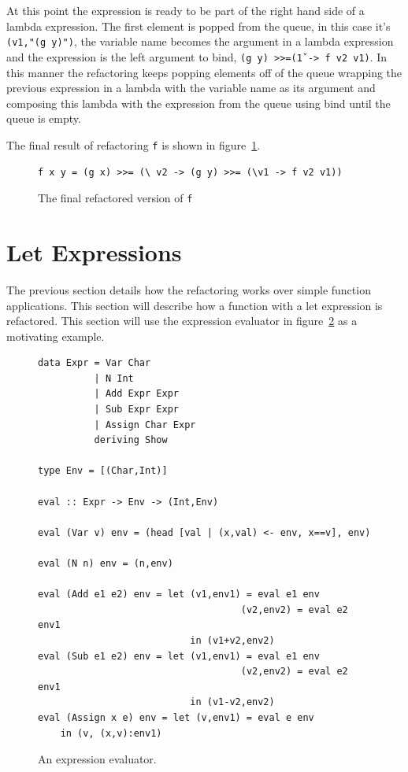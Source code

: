 At this point the expression is ready to be part of the right hand side of a lambda expression. The first element is popped from the queue, in this case it's \texttt{(v1,"(g y)")}, the variable name becomes the argument in a lambda expression and the expression is the left argument to bind, \texttt{(g y) >>=(\v1 -> f v2 v1)}. In this manner the refactoring keeps popping elements off of the queue wrapping the previous expression in a lambda with the variable name as its argument and composing this lambda with the expression from the queue using bind until the queue is empty.

The final result of refactoring \texttt{f} is shown in figure~\ref{simpF_ref}.

\begin{figure}[t]
\begin{lstlisting}
f x y = (g x) >>= (\ v2 -> (g y) >>= (\v1 -> f v2 v1))
\end{lstlisting}
\caption{The final refactored version of \texttt{f}}
\label{simpF_ref}
\end{figure}

\section{Let Expressions}

The previous section details how the refactoring works over simple function applications. This section will describe how a function with a let expression is refactored. This section will use the expression evaluator in figure~\ref{evalExpr} as a motivating example.

\begin{figure}[t]
\begin{lstlisting}
data Expr = Var Char
          | N Int
          | Add Expr Expr
          | Sub Expr Expr
          | Assign Char Expr
          deriving Show

type Env = [(Char,Int)]

eval :: Expr -> Env -> (Int,Env)

eval (Var v) env = (head [val | (x,val) <- env, x==v], env)

eval (N n) env = (n,env)

eval (Add e1 e2) env = let (v1,env1) = eval e1 env
                                    (v2,env2) = eval e2 env1 
                           in (v1+v2,env2)
eval (Sub e1 e2) env = let (v1,env1) = eval e1 env
                                    (v2,env2) = eval e2 env1 
                           in (v1-v2,env2)
eval (Assign x e) env = let (v,env1) = eval e env 
	in (v, (x,v):env1)
\end{lstlisting}
\caption{An expression evaluator.}
\label{evalExpr}
\end{figure}

